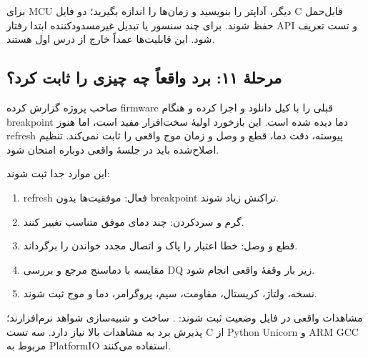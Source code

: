 برای MCU دیگر، آداپتر را بنویسید و زمان‌ها را اندازه بگیرید؛ دو فایل C قابل‌حمل حفظ شوند. برای چند سنسور یا تبدیل غیرمسدودکننده ابتدا رفتار API و تست تعریف شود. این قابلیت‌ها عمداً خارج از درس اول هستند.

\subsection{مرحلهٔ ۱۱: برد واقعاً چه چیزی را ثابت کرد؟}
صاحب پروژه گزارش کرده firmware قبلی را با کیل دانلود و اجرا کرده و هنگام breakpoint دما دیده شده است. این بازخورد اولیهٔ سخت‌افزار مفید است، اما هنوز refresh پیوسته، دقت دما، قطع و وصل و زمان موج واقعی را ثابت نمی‌کند. تنظیم اصلاح‌شده باید در جلسۀ واقعی دوباره امتحان شود.

این موارد جدا ثبت شوند:
\begin{enumerate}
\item refresh فعال: موفقیت‌ها بدون breakpoint تراکنش زیاد شوند.
\item گرم و سردکردن: چند دمای موفق متناسب تغییر کنند.
\item قطع و وصل: خطا اعتبار را پاک و اتصال مجدد خواندن را برگرداند.
\item مقایسه با دماسنج مرجع و بررسی DQ زیر بار وقفهٔ واقعی انجام شود.
\item نسخه، ولتاژ، کریستال، مقاومت، سیم، پروگرامر، دما و موج ثبت شوند.
\end{enumerate}
مشاهدات واقعی در فایل وضعیت ثبت شوند:
.
ساخت و شبیه‌سازی شواهد نرم‌افزارند؛ پذیرش برد به مشاهدات بالا نیاز دارد. سه تست C از Python Unicorn و ARM GCC مربوط به PlatformIO استفاده می‌کنند.
